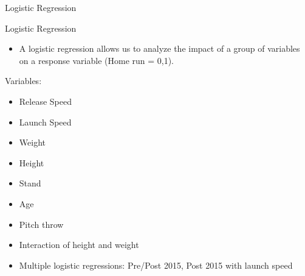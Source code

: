 \documentclass[14pt]{bredelebeamer}
\begin{document}
\begin{frame}{Logistic Regression}
\begin{alertblock}{Logistic Regression}
\begin{itemize}
\item A logistic regression allows us to analyze the impact of a group of variables on a response variable (Home run = 0,1). 
    \end{itemize}
    
\end{alertblock}
	
\begin{block}{Variables:}
	\begin{multicols}{3}
	\begin{itemize}
		\item Release Speed
        \item Launch Speed
        \item Weight
        \item Height
        \item Stand
        \item Age
        \item Pitch throw
        \item Interaction of height and weight
        \item Multiple logistic regressions: Pre/Post 2015, Post 2015 with launch speed
	\end{itemize}
    \end{multicols}
    \end{block}
\end{frame}
\end{document}
